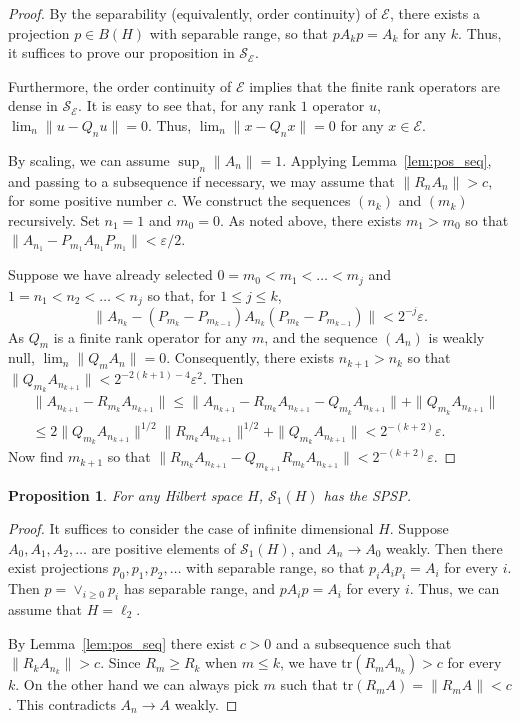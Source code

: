 \documentclass[12pt]{amsart}
\theoremstyle{plain}
\newtheorem{proposition}[theorem]{Proposition}
\theoremstyle{definition}
\renewcommand{\leq}{\leqslant}
\renewcommand{\geq}{\geqslant}\usepackage{amssymb}
\newcommand{\vr}{\varepsilon}
\newcommand{\is}{\mathcal S}
\newcommand{\trace}{\mathrm{tr}}
\newcommand{\ce}{\mathcal E}
\newcommand{\se}{{\mathcal S}_{\mathcal{E}}}
\def \vr{\varepsilon}
\begin{document}
\begin{proof}
By the separability (equivalently, order continuity) of $\ce$,
there exists a projection $p \in B(H)$ with separable range, so
that $p A_k p = A_k$ for any $k$. Thus, it suffices to prove
our proposition in $\se$.

Furthermore, the order continuity of $\ce$ implies that the finite rank
operators are dense in $\se$. It is easy to see that, for any rank $1$
operator $u$, $\lim_n \|u - Q_n u\| = 0$. Thus,
$\lim_n \|x - Q_n x\| = 0$ for any $x \in \ce$.

By scaling, we can assume $\sup_n \|A_n\| = 1$.
Applying Lemma~\ref{lem:pos_seq}, and passing to a subsequence if necessary,
we may assume  that $\|R_nA_{n}\|>c$, for some positive number $c$.
We construct the sequences $(n_k)$ and $(m_k)$ recursively. Set $n_1 = 1$
and $m_0 = 0$. As noted above, there exists $m_1 > m_0$ so that
$\|A_{n_1} - P_{m_1} A_{n_1} P_{m_1}\| < \vr/2$.

Suppose we have already selected $0 = m_0 < m_1 < \ldots < m_j$ and
$1 = n_1 < n_2 < \ldots < n_j$ so that, for $1 \leq j \leq k$,
$$
\|A_{n_k} - (P_{m_k} - P_{m_{k-1}}) A_{n_k} (P_{m_k} - P_{m_{k-1}})\| <
 2^{-j} \vr .
$$
As $Q_m$ is a finite rank operator for any $m$, and the sequence $(A_n)$
is weakly null, $\lim_n \|Q_m A_n\| = 0$. Consequently, there exists
$n_{k+1} > n_k$ so that $\|Q_{m_k} A_{n_{k+1}}\| < 2^{-2(k+1)-4} \vr^2$.
Then
\begin{eqnarray*}
&
\|A_{n_{k+1}} - R_{m_k} A_{n_{k+1}}\| \leq
\|A_{n_{k+1}} - R_{m_k} A_{n_{k+1}} - Q_{m_k} A_{n_{k+1}}\|
 + \|Q_{m_k} A_{n_{k+1}}\|
\\
&
\leq
2 \|Q_{m_k} A_{n_{k+1}}\|^{1/2} \|R_{m_k} A_{n_{k+1}}\|^{1/2}
 + \|Q_{m_k} A_{n_{k+1}}\|
< 2^{-(k+2)} \vr .
\end{eqnarray*}
Now find $m_{k+1}$ so that
$\|R_{m_k} A_{n_{k+1}} - Q_{m_{k+1}} R_{m_k} A_{n_{k+1}}\| < 2^{-(k+2)} \vr$.
\end{proof}

\begin{proposition} \label{prop:S_1_SPSP}
For any Hilbert space $H$, $\is_1(H)$ has the SPSP.
\end{proposition}

\begin{proof}
It suffices to consider the case of infinite dimensional $H$.
Suppose $A_0, A_1, A_2, \ldots$ are positive elements of $\is_1(H)$,
and $A_n \to A_0$ weakly. Then there exist projections $p_0, p_1, p_2, \ldots$
with separable range, so that $p_i A_i p_i = A_i$ for every $i$.
Then $p = \vee_{i \geq 0} p_i$ has separable range, and $p A_i p = A_i$
for every $i$. Thus, we can assume that $H = \ell_2$.

By Lemma~\ref{lem:pos_seq} there exist $c>0$ and a
subsequence such that $\|R_kA_{n_k}\|>c$. Since $R_m \ge R_k$ when $m \le k$,
we have $\trace (R_mA_{n_k}) >c$ for every $k$. On the other hand we can always
pick $m$ such that $\trace(R_mA)=\|R_mA\| <c$.
This contradicts $A_n \to A$  weakly.
\end{proof}
\end{document}

